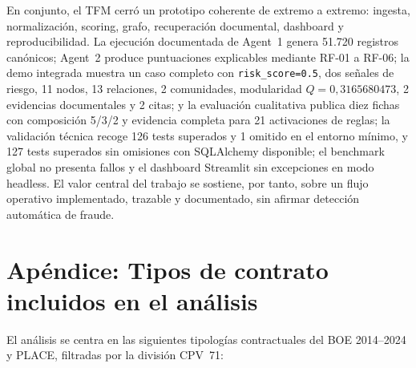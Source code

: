 \documentclass[11pt,a4paper,spanish]{book}
\numberwithin{equation}{chapter}
\numberwithin{figure}{chapter}
\begin{document}
En conjunto, el TFM cerr{\'o} un prototipo coherente de extremo a extremo: ingesta, normalizaci{\'o}n,
scoring, grafo, recuperaci{\'o}n documental, dashboard y reproducibilidad. La ejecuci{\'o}n documentada
de Agent~1 genera 51.720 registros can{\'o}nicos; Agent~2 produce puntuaciones explicables mediante
RF-01 a RF-06; la demo integrada muestra un caso completo con \texttt{risk\_score=0.5}, dos
se{\~n}ales de riesgo, 11 nodos, 13 relaciones, 2 comunidades, modularidad $Q=0{,}3165680473$, 2
evidencias documentales y 2 citas; y
la evaluaci{\'o}n cualitativa publica diez fichas con composici{\'o}n 5/3/2 y evidencia completa para
21 activaciones de reglas;
la validaci{\'o}n t{\'e}cnica recoge 126 tests superados y 1 omitido en el entorno m{\'i}nimo, y 127
tests superados sin omisiones con SQLAlchemy disponible; el benchmark global no presenta fallos y el
dashboard Streamlit sin excepciones en modo headless. El valor central del trabajo se sostiene, por tanto, sobre un flujo
operativo implementado, trazable y documentado, sin afirmar detecci{\'o}n autom{\'a}tica de fraude.




\appendix

\chapter{Ap{\'e}ndice: Tipos de contrato incluidos en el an{\'a}lisis}

El an{\'a}lisis se centra en las siguientes tipolog{\'i}as contractuales del BOE 2014--2024 y PLACE, filtradas por la divisi{\'o}n CPV~71:
\end{document}
